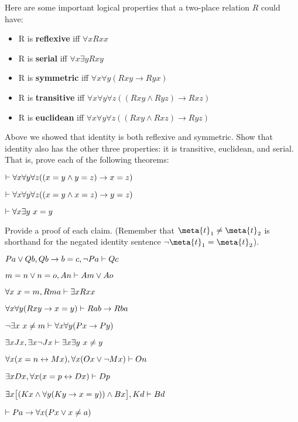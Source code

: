 \practiceproblems

\problempart Here are some important logical properties that a two-place relation $R$ could have:

\begin{itemize}
\item[] R is \textbf{reflexive} iff $\forall x Rxx$
\item[] R is \textbf{serial} iff $\forall x \exists y Rxy$
\item[] R is \textbf{symmetric} iff $\forall x \forall y(Rxy \rightarrow Ryx)$
\item[] R is \textbf{transitive} iff $\forall x \forall y \forall z((Rxy \land Ryz) \rightarrow Rxz)$
\item[] R is \textbf{euclidean} iff $\forall x \forall y \forall z((Rxy \land Rxz) \rightarrow Ryz)$
\end{itemize}

\noindent Above we showed that identity is both reflexive and symmetric.  Show that identity also has the other three properties: it is transitive, euclidean, and serial.  That is, prove each of the following theorems:

\begin{earg}
\item $\vdash \forall x \forall y \forall z((x=y \land y = z) \rightarrow x = z)$
\item $\vdash \forall x \forall y \forall z((x=y \land x=z) \rightarrow y = z)$
\item $\vdash \forall x \exists y \ x = y$
\end{earg}




\problempart
\label{pr.identity}
Provide a proof of each claim. (Remember that $\meta{t}_1 \neq \meta{t}_2$ is shorthand for the negated identity sentence $\enot \meta{t}_1 = \meta{t}_2$).
\begin{earg}
\item $Pa \vee Qb, Qb \rightarrow b=c, \neg Pa \vdash Qc$
\item $m=n \vee n=o, An \vdash Am \vee Ao$
\item $\forall x\ x=m, Rma\vdash \exists x Rxx$
\item $\forall x\forall y(Rxy \rightarrow x=y)\vdash Rab \rightarrow Rba$
\item $\neg \exists x \ x \neq m \vdash \forall x\forall y (Px \rightarrow Py)$
\item $\exists x Jx, \exists x \neg Jx\vdash \exists x \exists y\ x \neq y$
\item $\forall x(x=n \leftrightarrow Mx), \forall x(Ox \vee \neg Mx)\vdash On$
\item $\exists x Dx, \forall x(x=p \leftrightarrow Dx)\vdash Dp$
\item $\exists x\bigl[(Kx \wedge \forall y(Ky \rightarrow x=y)) \wedge Bx\bigr], Kd\vdash Bd$
\item $\vdash Pa \rightarrow \forall x(Px \vee  x \neq a)$
\end{earg}

